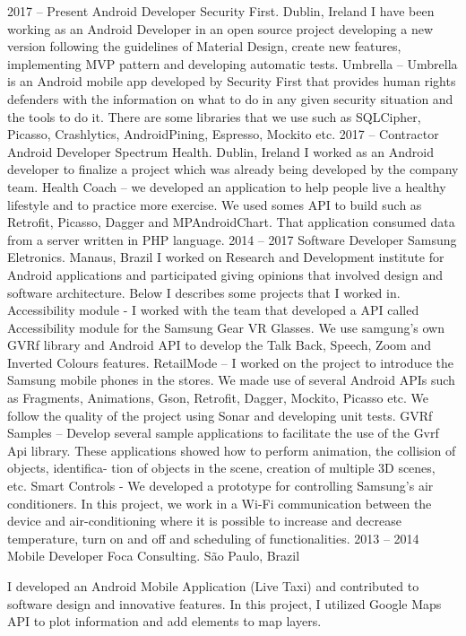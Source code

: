 \documentclass[9pt]{developercv} %
\begin{document}
\begin{entrylist}
	\entry
		{2017 -- Present}
		{Android Developer}
		{Security First. Dublin, Ireland}
		{I have been working as an Android Developer in an open source project developing a new version following the guidelines of Material Design, create new features, implementing MVP pattern and developing automatic tests.
Umbrella – Umbrella is an Android mobile app developed by Security First that provides human rights defenders with the information on what to do in any given security situation and the tools to do it. There are some libraries that we use such as SQLCipher, Picasso, Crashlytics, AndroidPining, Espresso, Mockito etc.
}
	\entry
		{2017 -- Contractor}
		{Android Developer}
		{Spectrum Health. Dublin, Ireland}
		{I worked as an Android developer to finalize a project which was already being developed by the company team.
Health Coach – we developed an application to help people live a healthy lifestyle and to practice more exercise. We used somes API to build such as Retrofit, Picasso, Dagger and MPAndroidChart. That application consumed data from a server written in PHP language.}
	\entry
		{2014 -- 2017}
		{Software Developer}
		{Samsung Eletronics. Manaus, Brazil}
		{I worked on Research and Development institute for Android applications and participated giving opinions that involved design and software architecture. Below I describes some projects that I worked in.
Accessibility module - I worked with the team that developed a API called Accessibility module for the Samsung Gear VR Glasses. We use samgung’s own GVRf library and Android API to develop the Talk Back, Speech, Zoom and Inverted Colours features.
RetailMode – I worked on the project to introduce the Samsung mobile phones in the stores. We made use of several Android APIs such as Fragments, Animations, Gson, Retrofit, Dagger, Mockito, Picasso etc. We follow the quality of the project using Sonar and developing unit tests.
GVRf Samples – Develop several sample applications to facilitate the use of the Gvrf Api library. These applications showed how to perform animation, the collision of objects, identifica- tion of objects in the scene, creation of multiple 3D scenes, etc.
Smart Controls - We developed a prototype for controlling Samsung’s air conditioners. In this project, we work in a Wi-Fi communication between the device and air-conditioning where it is possible to increase and decrease temperature, turn on and off and scheduling of functionalities.}
	\entry
		{2013 -- 2014}
		{Mobile Developer}
		{Foca Consulting. São Paulo, Brazil}
		{I developed an Android Mobile Application (Live Taxi) and contributed to software design and innovative features. In this project, I utilized Google Maps API to plot information and add elements to map layers.

}
\end{entrylist}
\end{document}
